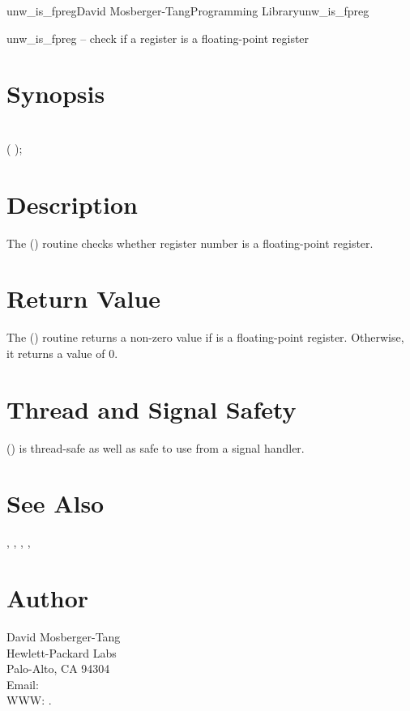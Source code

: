 \documentclass{article}
\begin{document}
\begin{Name}{3}{unw\_is\_fpreg}{David Mosberger-Tang}{Programming Library}{unw\_is\_fpreg}

  unw\_is\_fpreg -- check if a register is a floating-point register
\end{Name}

\section{Synopsis}

\\

 ( );\\

\section{Description}

The () routine checks whether register number
 is a floating-point register.

\section{Return Value}

The () routine returns a non-zero value if
 is a floating-point register.  Otherwise, it returns a value
of 0.

\section{Thread and Signal Safety}

() is thread-safe as well as safe to use
from a signal handler.

\section{See Also}

,
,
,
,

\section{Author}

\noindent
David Mosberger-Tang\\
Hewlett-Packard Labs\\
Palo-Alto, CA 94304\\
Email: \\
WWW: .
\LatexManEnd
\end{document}
